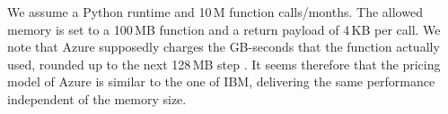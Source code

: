 %
We assume a Python runtime and 10\,M function calls/months.
The allowed memory is set to a 100\,\gls{MB} function and a return payload of 4\,KB per call.
We note that Azure supposedly charges the GB-seconds that the function actually used, rounded up to the next 128\,\gls{MB} step \cite{AzurePricing}. 
It seems therefore that the pricing model of Azure is similar to the one of \gls{IBM}, delivering the same performance independent of the memory size.

